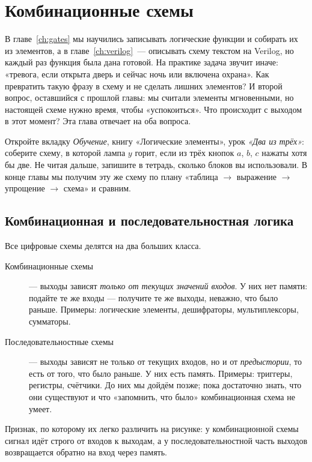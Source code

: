 \chapter{Комбинационные схемы}
\label{ch:comb}

В главе~\ref{ch:gates} мы научились записывать логические функции и собирать
их из элементов, а в главе~\ref{ch:verilog}~--- описывать схему текстом на
Verilog, но каждый раз функция была дана готовой. На практике
задача звучит иначе: «тревога, если открыта дверь и сейчас ночь или включена
охрана». Как превратить такую фразу в схему и не сделать лишних
элементов? И второй вопрос, оставшийся с прошлой главы: мы считали элементы
мгновенными, но настоящей схеме нужно время, чтобы «успокоиться». Что
происходит с выходом в этот момент? Эта глава отвечает на оба вопроса.

\begin{buildbox}
Откройте вкладку \emph{Обучение}, книгу «Логические элементы», урок
\emph{«Два из трёх»}: соберите схему, в которой лампа $y$ горит, если из трёх
кнопок $a$, $b$, $c$ нажаты хотя бы две. Не читая дальше, запишите в тетрадь,
сколько блоков вы использовали. В конце главы мы получим эту же схему
по плану «таблица $\to$ выражение $\to$ упрощение $\to$ схема» и сравним.
\end{buildbox}

\section{Комбинационная и последовательностная логика}

Все цифровые схемы делятся на два больших класса.

\begin{description}
  \item[Комбинационные схемы] --- выходы зависят \emph{только от текущих
    значений входов}. У них нет памяти: подайте те же входы --- получите те же
    выходы, неважно, что было раньше. Примеры: логические элементы,
    дешифраторы, мультиплексоры, сумматоры.
  \item[Последовательностные схемы] --- выходы зависят не только от текущих
    входов, но и от \emph{предыстории}, то есть от того, что было раньше.
    У них есть память. Примеры: триггеры, регистры, счётчики. До них мы
    дойдём позже; пока достаточно знать, что они существуют и что
    «запомнить, что было» комбинационная схема не умеет.
\end{description}

Признак, по которому их легко различить на рисунке: у комбинационной схемы
сигнал идёт строго от входов к выходам, а у последовательностной часть
выходов возвращается обратно на вход через память.

